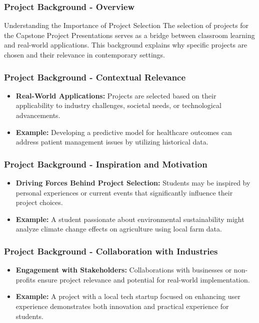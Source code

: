\documentclass[aspectratio=169]{beamer}
\begin{document}
\begin{frame}[fragile]
  \frametitle{Project Background - Overview}
  \begin{block}{Understanding the Importance of Project Selection}
    The selection of projects for the Capstone Project Presentations serves as a bridge between classroom learning and real-world applications. This background explains why specific projects are chosen and their relevance in contemporary settings.
  \end{block}
\end{frame}

\begin{frame}[fragile]
  \frametitle{Project Background - Contextual Relevance}
  \begin{itemize}
    \item \textbf{Real-World Applications:} 
    Projects are selected based on their applicability to industry challenges, societal needs, or technological advancements.
    \item \textbf{Example:} 
    Developing a predictive model for healthcare outcomes can address patient management issues by utilizing historical data.
  \end{itemize}
\end{frame}

\begin{frame}[fragile]
  \frametitle{Project Background - Inspiration and Motivation}
  \begin{itemize}
    \item \textbf{Driving Forces Behind Project Selection:} 
    Students may be inspired by personal experiences or current events that significantly influence their project choices.
    \item \textbf{Example:} 
    A student passionate about environmental sustainability might analyze climate change effects on agriculture using local farm data.
  \end{itemize}
\end{frame}

\begin{frame}[fragile]
  \frametitle{Project Background - Collaboration with Industries}
  \begin{itemize}
    \item \textbf{Engagement with Stakeholders:} 
    Collaborations with businesses or non-profits ensure project relevance and potential for real-world implementation.
    \item \textbf{Example:} 
    A project with a local tech startup focused on enhancing user experience demonstrates both innovation and practical experience for students.
  \end{itemize}
\end{frame}
\end{document}
